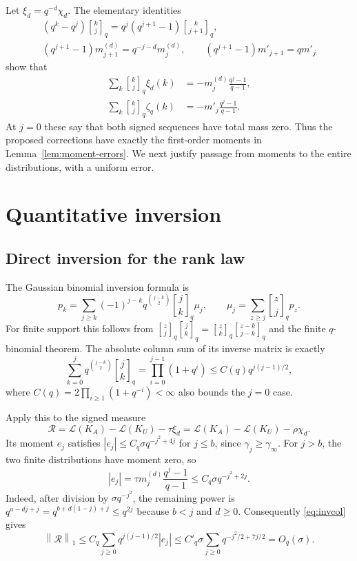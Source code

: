 \documentclass[11pt,letterpaper]{article}
\theoremstyle{remark}
\newcommand{\Law}{\mathcal L}
\newcommand{\qb}[2]{\genfrac{[}{]}{0pt}{}{#1}{#2}_{q}}
\newcommand{\norm}[1]{\left\lVert #1\right\rVert}
\begin{document}
Let $\xi_d=q^{-d}\chi_d$. The elementary identities
\begin{gather}
 (q^k-q^j)\qb kj=q^j(q^{j+1}-1)\qb k{j+1},\label{eq:tilt}\\
 (q^{j+1}-1)m_{j+1}^{(d)}=q^{-j-d}m_j^{(d)},\qquad
 (q^{j+1}-1)m'_{j+1}=qm'_j\nonumber
\end{gather}
show that
\begin{align}
 \sum_k\qb kj\xi_d(k)
     &=-m_j^{(d)}\frac{q^j-1}{q-1},\label{eq:xi-mom}\\
 \sum_k\qb kj\zeta_q(k)
     &=-m'_j\frac{q^j-1}{q-1}.\label{eq:zeta-mom}
\end{align}
At $j=0$ these say that both signed sequences have total mass zero.
Thus the proposed corrections have exactly the first-order moments in
Lemma~\ref{lem:moment-errors}. We next justify passage from moments to
the entire distributions, with a uniform error.

\section{Quantitative inversion}

\subsection{Direct inversion for the rank law}

The Gaussian binomial inversion formula is
\begin{equation}\label{eq:inversion}
 p_k=\sum_{j\ge k}(-1)^{j-k}q^{\binom{j-k}2}\qb j k\mu_j,
       \qquad \mu_j=\sum_{z\ge j}\qb zj p_z.
\end{equation}
For finite support this follows from
$\qb zj\qb jk=\qb zk\qb{z-k}{j-k}$ and the finite $q$-binomial theorem.
The absolute column sum of its inverse matrix is exactly
\begin{equation}\label{eq:invcol}
 \sum_{k=0}^j q^{\binom{j-k}2}\qb jk
   =\prod_{i=0}^{j-1}(1+q^i)
   \le C(q)q^{j(j-1)/2},
\end{equation}
where $C(q)=2\prod_{i\ge1}(1+q^{-i})<\infty$ also bounds the $j=0$ case.

Apply this to the signed measure
\[
 \mathcal R=\Law(K_A)-\Law(K_U)-\tau\xi_d
            =\Law(K_A)-\Law(K_U)-\rho\chi_d.
\]
Its moment $e_j$ satisfies $|e_j|\le C_q\sigma q^{-j^2+4j}$ for
$j\le b$, since $\gamma_j\ge\gamma_\infty$.
For $j>b$, the two finite distributions have moment zero, so
\[
 |e_j|=\tau m_j^{(d)}\frac{q^j-1}{q-1}
       \le C_q\sigma q^{-j^2+2j}.
\]
Indeed, after division by $\sigma q^{-j^2}$, the remaining power is
$q^{a-dj+j}=q^{b+d(1-j)+j}\le q^{2j}$ because $b<j$ and $d\ge0$.
Consequently \eqref{eq:invcol} gives
\begin{equation}\label{eq:rank-remainder}
 \norm{\mathcal R}_1
 \le C_q\sum_{j\ge0}q^{j(j-1)/2}|e_j|
 \le C'_q\sigma\sum_{j\ge0}q^{-j^2/2+7j/2}
 =O_q(\sigma).
\end{equation}
\end{document}
